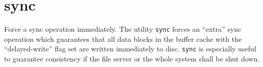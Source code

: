 \section{sync}
\begin{man}
  \PP Force a sync operation immediately.
  \DE The utility {\tt sync} forces an ``extra'' sync operation which guarantees
             that all data blocks in the buffer cache with the ``delayed-write''
             flag set are written immediately to disc. {\tt sync} is especially
             useful to guarantee consistency if the file server or the whole
             system shall be shut down.
\end{man}
